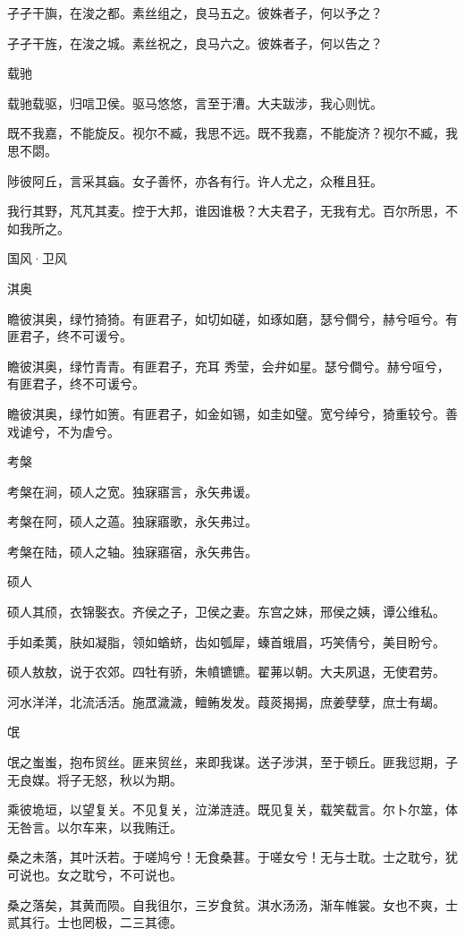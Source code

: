 孑孑干旟，在浚之都。素丝组之，良马五之。彼姝者子，何以予之？

孑孑干旌，在浚之城。素丝祝之，良马六之。彼姝者子，何以告之？

载驰

载驰载驱，归唁卫侯。驱马悠悠，言至于漕。大夫跋涉，我心则忧。

既不我嘉，不能旋反。视尔不臧，我思不远。既不我嘉，不能旋济？视尔不臧，我思不閟。

陟彼阿丘，言采其蝱。女子善怀，亦各有行。许人尤之，众稚且狂。

我行其野，芃芃其麦。控于大邦，谁因谁极？大夫君子，无我有尤。百尔所思，不如我所之。




国风·卫风


淇奥

瞻彼淇奥，绿竹猗猗。有匪君子，如切如磋，如琢如磨，瑟兮僴兮，赫兮咺兮。有匪君子，终不可谖兮。

瞻彼淇奥，绿竹青青。有匪君子，充耳 秀莹，会弁如星。瑟兮僴兮。赫兮咺兮，有匪君子，终不可谖兮。

瞻彼淇奥，绿竹如箦。有匪君子，如金如锡，如圭如璧。宽兮绰兮，猗重较兮。善戏谑兮，不为虐兮。

考槃

考槃在涧，硕人之宽。独寐寤言，永矢弗谖。

考槃在阿，硕人之薖。独寐寤歌，永矢弗过。

考槃在陆，硕人之轴。独寐寤宿，永矢弗告。

硕人

硕人其颀，衣锦褧衣。齐侯之子，卫侯之妻。东宫之妹，邢侯之姨，谭公维私。

手如柔荑，肤如凝脂，领如蝤蛴，齿如瓠犀，螓首蛾眉，巧笑倩兮，美目盼兮。

硕人敖敖，说于农郊。四牡有骄，朱幩镳镳。翟茀以朝。大夫夙退，无使君劳。

河水洋洋，北流活活。施罛濊濊，鳣鲔发发。葭菼揭揭，庶姜孽孽，庶士有朅。

氓

氓之蚩蚩，抱布贸丝。匪来贸丝，来即我谋。送子涉淇，至于顿丘。匪我愆期，子无良媒。将子无怒，秋以为期。

乘彼垝垣，以望复关。不见复关，泣涕涟涟。既见复关，载笑载言。尔卜尔筮，体无咎言。以尔车来，以我贿迁。

桑之未落，其叶沃若。于嗟鸠兮！无食桑葚。于嗟女兮！无与士耽。士之耽兮，犹可说也。女之耽兮，不可说也。

桑之落矣，其黄而陨。自我徂尔，三岁食贫。淇水汤汤，渐车帷裳。女也不爽，士贰其行。士也罔极，二三其德。

